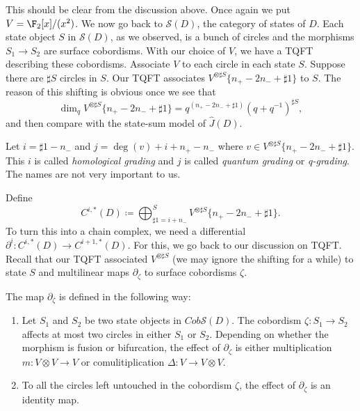 This should be clear from the discussion above. Once again we put $V = \F_2[x]/(x^2)$. We now go back to $\mathcal{S} (D)$, the category of states of $D$. Each state object $S$ in $\mathcal{S}(D)$, as we observed, is a bunch of circles and the morphisms $S_1 \to S_2$ are surface cobordisms. With our choice of $V$, we have a TQFT describing these cobordisms. Associate $V$ to each circle in each state $S$. Suppose there are $\sharp S$ circles in $S$. Our TQFT associates $V^{\otimes \sharp S} \{n_+ - 2n_- + \sharp 1\}$ to $S$. The reason of this shifting is obvious once we see that
\begin{equation}
\label{eq:16}
\dim_q V^{\otimes \sharp S} \{n_+ - 2n_- + \sharp 1\} = q^{(n_+ - 2n_- + \sharp 1)} (q + q^{-1})^{\sharp S},
\end{equation}
and then compare with the state-sum model of $\hat{J}(D)$.

Let $i = \sharp 1 - n_-$ and $j = \deg(v) + i + n_+ - n_-$ where $v \in V^{\otimes \sharp S} \{n_+ - 2n_- + \sharp 1\}$. This $i$ is called \emph{homological grading} and $j$ is called \emph{quantum grading} or \emph{q-grading}. The names are not very important to us.

Define 
\begin{equation}
\label{eq:17}
C^{i,*}(D) \coloneqq \bigoplus_{\sharp 1 = i + n_-}^{S} V^{\otimes \sharp S} \{n_+ - 2n_- + \sharp 1\}.
\end{equation}
To turn this into a chain complex, we need a differential $\partial^i : C^{i,*}(D) \to C^{i+1, *}(D)$. For this, we go back to our discussion on TQFT. Recall that our TQFT associated $V^{\otimes \sharp S}$ (we may ignore the shifting for a while) to state $S$ and multilinear maps $\partial_{\zeta}$ to surface cobordisms $\zeta$.

The map $\partial_{\zeta}$ is defined in the following way:
\begin{enumerate}
\item\label{item:7} Let $S_1$ and $S_2$ be two state objects in $Cob \mathcal{S}(D)$. The cobordism $\zeta : S_1 \to S_2$ affects at most two circles in either $S_1$ or $S_2$. Depending on whether the morphism is fusion or bifurcation, the effect of $\partial_{\zeta}$ is either multiplication $m: V \otimes V \to V$ or comulitiplication $\Delta: V \to V\otimes V$. 
\item\label{item:8} To all the circles left untouched in the cobordism $\zeta$, the effect of $\partial_{\zeta}$ is an identity map.
\end{enumerate}

